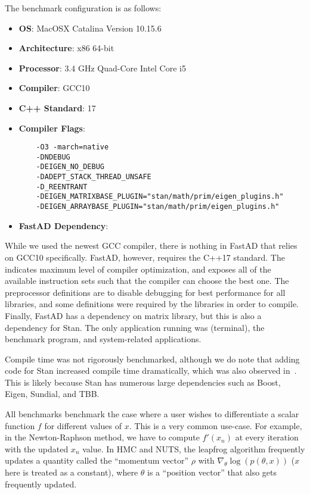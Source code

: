 The benchmark configuration is as follows:
\begin{itemize}
    \item \textbf{OS}: MacOSX Catalina Version 10.15.6 
    \item \textbf{Architecture}: x86 64-bit
    \item \textbf{Processor}: 3.4 GHz Quad-Core Intel Core i5
    \item \textbf{Compiler}: GCC10
    \item \textbf{C++ Standard}: 17
    \item \textbf{Compiler Flags}: 
\begin{verbatim}
    -O3 -march=native 
    -DNDEBUG 
    -DEIGEN_NO_DEBUG 
    -DADEPT_STACK_THREAD_UNSAFE 
    -D_REENTRANT 
    -DEIGEN_MATRIXBASE_PLUGIN="stan/math/prim/eigen_plugins.h" 
    -DEIGEN_ARRAYBASE_PLUGIN="stan/math/prim/eigen_plugins.h"
\end{verbatim}
    \item \textbf{FastAD Dependency}: 
\end{itemize}
While we used the newest GCC compiler, there is nothing in FastAD that relies on GCC10 specifically.
FastAD, however, requires the C++17 standard.
The  indicates maximum level of compiler optimization,
and  exposes all of the available instruction sets 
such that the compiler can choose the best one.
The preprocessor definitions are to disable debugging
for best performance for all libraries, and some definitions were required by the libraries in order to compile.
Finally, FastAD has a dependency on  matrix library,
but this is also a dependency for Stan.
The only application running was  (terminal),
the benchmark program, and system-related applications.

Compile time was not rigorously benchmarked, 
although we do note that adding code for Stan
increased compile time dramatically, which was also observed in~\cite{carpenter:2015}.
This is likely because Stan has numerous large dependencies such as Boost, Eigen, Sundial, and TBB.\@
\fi

All benchmarks benchmark the case where a user wishes to differentiate
a scalar function $f$ for different values of $x$.
This is a very common use-case.
For example, in the Newton-Raphson method,
we have to compute $f'(x_n)$ at every iteration with the updated $x_n$ value.
In HMC and NUTS, the leapfrog algorithm frequently
updates a quantity called the ``momentum vector'' $\rho$ 
with $\nabla_\theta \log(p(\theta, x))$ ($x$ here is treated as a constant),
where $\theta$ is a ``position vector'' that also gets frequently updated.

